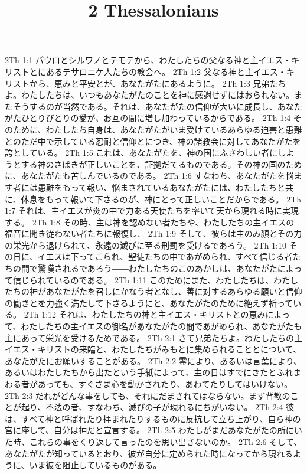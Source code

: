 

\title{2 Thessalonians}

2Th 1:1  パウロとシルワノとテモテから、わたしたちの父なる神と主イエス・キリストとにあるテサロニケ人たちの教会へ。
2Th 1:2  父なる神と主イエス・キリストから、恵みと平安とが、あなたがたにあるように。
2Th 1:3  兄弟たちよ。わたしたちは、いつもあなたがたのことを神に感謝せずにはおられない。またそうするのが当然である。それは、あなたがたの信仰が大いに成長し、あなたがたひとりびとりの愛が、お互の間に増し加わっているからである。
2Th 1:4  そのために、わたしたち自身は、あなたがたがいま受けているあらゆる迫害と患難とのただ中で示している忍耐と信仰とにつき、神の諸教会に対してあなたがたを誇としている。
2Th 1:5  これは、あなたがたを、神の国にふさわしい者にしようとする神のさばきが正しいことを、証拠だてるものである。その神の国のために、あなたがたも苦しんでいるのである。
2Th 1:6  すなわち、あなたがたを悩ます者には患難をもって報い、悩まされているあなたがたには、わたしたちと共に、休息をもって報いて下さるのが、神にとって正しいことだからである。
2Th 1:7  それは、主イエスが炎の中で力ある天使たちを率いて天から現れる時に実現する。
2Th 1:8  その時、主は神を認めない者たちや、わたしたちの主イエスの福音に聞き従わない者たちに報復し、
2Th 1:9  そして、彼らは主のみ顔とその力の栄光から退けられて、永遠の滅びに至る刑罰を受けるであろう。
2Th 1:10  その日に、イエスは下ってこられ、聖徒たちの中であがめられ、すべて信じる者たちの間で驚嘆されるであろう――わたしたちのこのあかしは、あなたがたによって信じられているのである。
2Th 1:11  このためにまた、わたしたちは、わたしたちの神があなたがたを召しにかなう者となし、善に対するあらゆる願いと信仰の働きとを力強く満たして下さるようにと、あなたがたのために絶えず祈っている。
2Th 1:12  それは、わたしたちの神と主イエス・キリストとの恵みによって、わたしたちの主イエスの御名があなたがたの間であがめられ、あなたがたも主にあって栄光を受けるためである。
2Th 2:1  さて兄弟たちよ。わたしたちの主イエス・キリストの来臨と、わたしたちがみもとに集められることとについて、あなたがたにお願いすることがある。
2Th 2:2  霊により、あるいは言葉により、あるいはわたしたちから出たという手紙によって、主の日はすでにきたとふれまわる者があっても、すぐさま心を動かされたり、あわてたりしてはいけない。
2Th 2:3  だれがどんな事をしても、それにだまされてはならない。まず背教のことが起り、不法の者、すなわち、滅びの子が現れるにちがいない。
2Th 2:4  彼は、すべて神と呼ばれたり拝まれたりするものに反抗して立ち上がり、自ら神の宮に座して、自分は神だと宣言する。
2Th 2:5  わたしがまだあなたがたの所にいた時、これらの事をくり返して言ったのを思い出さないのか。
2Th 2:6  そして、あなたがたが知っているとおり、彼が自分に定められた時になってから現れるように、いま彼を阻止しているものがある。
